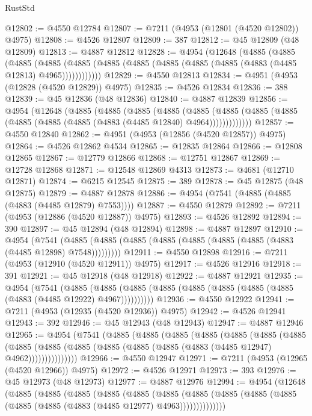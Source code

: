 \begin{lexlean}{RustStd}
\begin{coremodule}
@12802 := @4550 @12784
@12807 := @7211 (@4953 (@12801 (@4520 @12802)) @4975)
@12808 := @4526 @12807
@12809 := 387
@12812 := @45 @12809 (@48 @12809)
@12813 := @4887 @12812
@12828 := @4954
    (@12648
      (@4885
        (@4885
          (@4885
            (@4885 (@4885 (@4885 (@4885 (@4885 (@4885 (@4885 (@4883 (@4485 @12813) @4965))))))))))))
@12829 := @4550 @12813
@12834 := @4951 (@4953 (@12828 (@4520 @12829)) @4975)
@12835 := @4526 @12834
@12836 := 388
@12839 := @45 @12836 (@48 @12836)
@12840 := @4887 @12839
@12856 := @4954
    (@12648
      (@4885
        (@4885
          (@4885
            (@4885
              (@4885
                (@4885 (@4885 (@4885 (@4885 (@4885 (@4885 (@4883 (@4485 @12840) @4964)))))))))))))
@12857 := @4550 @12840
@12862 := @4951 (@4953 (@12856 (@4520 @12857)) @4975)
@12864 := @4526 @12862 @4534
@12865 := @12835 @12864
@12866 := @12808 @12865
@12867 := @12779 @12866
@12868 := @12751 @12867
@12869 := @12728 @12868
@12871 := @12548 @12869 @4313
@12873 := @4681 (@12710 @12871)
@12874 := @6215 @12545
@12875 := 389
@12878 := @45 @12875 (@48 @12875)
@12879 := @4887 @12878
@12886 := @4954 (@7541 (@4885 (@4885 (@4883 (@4485 @12879) @7553))))
@12887 := @4550 @12879
@12892 := @7211 (@4953 (@12886 (@4520 @12887)) @4975)
@12893 := @4526 @12892
@12894 := 390
@12897 := @45 @12894 (@48 @12894)
@12898 := @4887 @12897
@12910 := @4954
    (@7541 (@4885 (@4885 (@4885 (@4885 (@4885 (@4885 (@4885 (@4883 (@4485 @12898) @7548)))))))))
@12911 := @4550 @12898
@12916 := @7211 (@4953 (@12910 (@4520 @12911)) @4975)
@12917 := @4526 @12916
@12918 := 391
@12921 := @45 @12918 (@48 @12918)
@12922 := @4887 @12921
@12935 := @4954
    (@7541
      (@4885 (@4885 (@4885 (@4885 (@4885 (@4885 (@4885 (@4885 (@4883 (@4485 @12922) @4967))))))))))
@12936 := @4550 @12922
@12941 := @7211 (@4953 (@12935 (@4520 @12936)) @4975)
@12942 := @4526 @12941
@12943 := 392
@12946 := @45 @12943 (@48 @12943)
@12947 := @4887 @12946
@12965 := @4954
    (@7541
      (@4885
        (@4885
          (@4885
            (@4885
              (@4885
                (@4885
                  (@4885
                    (@4885
                      (@4885 (@4885 (@4885 (@4885 (@4885 (@4883 (@4485 @12947) @4962)))))))))))))))
@12966 := @4550 @12947
@12971 := @7211 (@4953 (@12965 (@4520 @12966)) @4975)
@12972 := @4526 @12971
@12973 := 393
@12976 := @45 @12973 (@48 @12973)
@12977 := @4887 @12976
@12994 := @4954
    (@12648
      (@4885
        (@4885
          (@4885
            (@4885
              (@4885
                (@4885
                  (@4885
                    (@4885 (@4885 (@4885 (@4885 (@4885 (@4883 (@4485 @12977) @4963))))))))))))))

\end{coremodule}
\end{lexlean}
